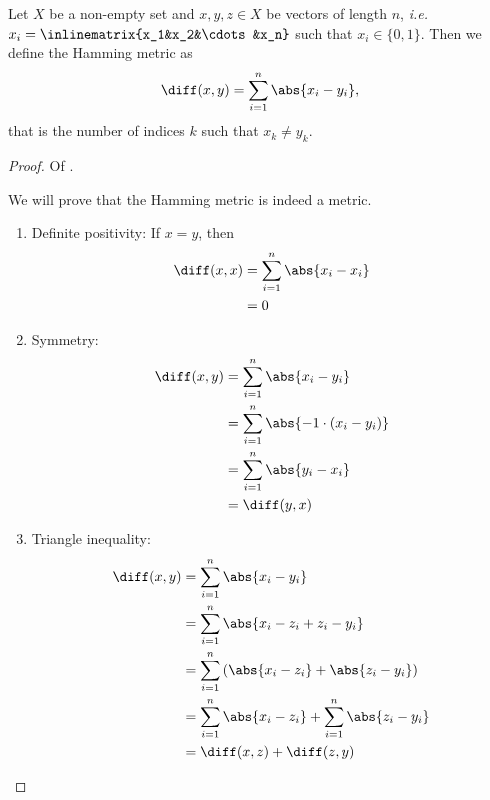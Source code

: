 \begin{definition}\label{def-hamming-metric}
	Let $X$ be a non-empty set and $x,y,z\in X$ be vectors of length $n$, \textit{i.e.}
	$x_i=\inlinematrix{x_1&x_2&\cdots&x_n}$ such that $x_i\in\{0,1\}$. Then we define
	the Hamming metric as
	\begin{equation*}
		\diff(x,y) = \sum_{i=1}^n \abs{x_i-y_i},
	\end{equation*}
	that is the number of indices $k$ such that $x_k\neq y_k$.
\end{definition}

\begin{proof}
	Of .
	\begin{flushleft}
		We will prove that the Hamming metric is indeed a metric.
		\begin{enumerate}
			\item Definite positivity: If $x=y$, then
			      \begin{align*}
				      \diff(x,x) & = \sum_{i=1}^n \abs{x_i-x_i} \\
				                 & = 0
			      \end{align*}
			\item Symmetry:
			      \begin{align*}
				      \diff(x,y) & = \sum_{i=1}^n \abs{x_i-y_i}          \\
				                 & = \sum_{i=1}^n \abs{-1\cdot(x_i-y_i)} \\
				                 & = \sum_{i=1}^n \abs{y_i-x_i}          \\
				                 & = \diff(y,x)
			      \end{align*}
			\item Triangle inequality:
			      \begin{align*}
				      \diff(x,y) & = \sum_{i=1}^n \abs{x_i-y_i}                              \\
				                 & = \sum_{i=1}^n \abs{x_i-z_i+z_i-y_i}                      \\
				                 & = \sum_{i=1}^n \left(\abs{x_i-z_i}+\abs{z_i-y_i}\right)   \\
				                 & = \sum_{i=1}^n \abs{x_i-z_i} + \sum_{i=1}^n \abs{z_i-y_i} \\
				                 & = \diff(x,z) + \diff(z,y)
			      \end{align*}
		\end{enumerate}
	\end{flushleft}
\end{proof}


